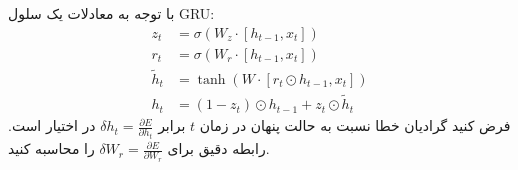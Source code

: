 \documentclass[12pt,a4paper]{article}
\begin{document}
	\begin{tcolorbox}[colback=lightblue,colframe=mainblue,title=\textbf{صورت مسئله}]
		با توجه به معادلات یک سلول GRU:
		$$
		\begin{aligned}
			z_t &= \sigma(W_z \cdot [h_{t-1}, x_t]) \\
			r_t &= \sigma(W_r \cdot [h_{t-1}, x_t]) \\
			\tilde{h}_t &= \tanh(W \cdot [r_t \odot h_{t-1}, x_t]) \\
			h_t &= (1 - z_t) \odot h_{t-1} + z_t \odot \tilde{h}_t
		\end{aligned}
		$$
		فرض کنید گرادیان خطا نسبت به حالت پنهان در زمان $t$ برابر $\delta h_t = \frac{\partial E}{\partial h_t}$ در اختیار است. رابطه دقیق برای $\delta W_r = \frac{\partial E}{\partial W_r}$ را محاسبه کنید.
	\end{tcolorbox}
	
\end{document}
